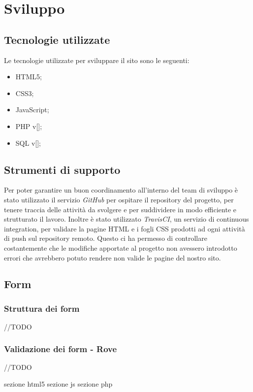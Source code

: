 \documentclass[12pt]{article}
\begin{document}
	\section{Sviluppo}
	\subsection{Tecnologie utilizzate}
	Le tecnologie utilizzate per sviluppare il sito sono le seguenti:
	\begin{itemize}
		\item HTML5;
		\item CSS3;
		\item JavaScript;
		\item PHP v[];
		\item SQL v[];
	\end{itemize}
	\subsection{Strumenti di supporto}
	Per poter garantire un buon coordinamento all'interno del team di sviluppo è stato utilizzato il servizio \emph{GitHub} per ospitare il repository del progetto, per tenere traccia delle attività da svolgere e per suddividere in modo efficiente e strutturato il lavoro. Inoltre è stato utilizzato \emph{TravisCI}, un servizio di continuous integration, per validare la pagine HTML e i fogli CSS prodotti ad ogni attività di push sul repository remoto. Questo ci ha permesso di controllare costantemente che le modifiche apportate al progetto non avessero introdotto errori che avrebbero potuto rendere non valide le pagine del nostro sito.
	\subsection{Form}
	\subsubsection{Struttura dei form}
	//TODO
	\subsubsection{Validazione dei form - Rove}
	//TODO	
	
	sezione html5
	sezione js
	sezione php
\end{document}
